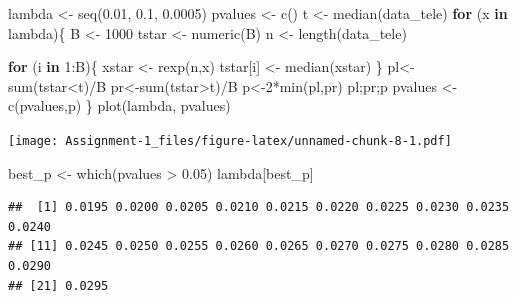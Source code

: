\documentclass[
]{article}
\newenvironment{Shaded}{\begin{snugshade}}{\end{snugshade}}
\newcommand{\ControlFlowTok}[1]{\textcolor[rgb]{0.13,0.29,0.53}{\textbf{#1}}}
\newcommand{\DecValTok}[1]{\textcolor[rgb]{0.00,0.00,0.81}{#1}}
\newcommand{\FloatTok}[1]{\textcolor[rgb]{0.00,0.00,0.81}{#1}}
\newcommand{\FunctionTok}[1]{\textcolor[rgb]{0.00,0.00,0.00}{#1}}
\newcommand{\NormalTok}[1]{#1}
\newcommand{\OtherTok}[1]{\textcolor[rgb]{0.56,0.35,0.01}{#1}}
\newcommand{\SpecialCharTok}[1]{\textcolor[rgb]{0.00,0.00,0.00}{#1}}
\begin{document}
\begin{Shaded}
\begin{Highlighting}[]
\NormalTok{lambda }\OtherTok{\textless{}{-}} \FunctionTok{seq}\NormalTok{(}\FloatTok{0.01}\NormalTok{, }\FloatTok{0.1}\NormalTok{, }\FloatTok{0.0005}\NormalTok{)}
\NormalTok{pvalues }\OtherTok{\textless{}{-}} \FunctionTok{c}\NormalTok{()}
\NormalTok{t }\OtherTok{\textless{}{-}} \FunctionTok{median}\NormalTok{(data\_tele)}
\ControlFlowTok{for}\NormalTok{ (x }\ControlFlowTok{in}\NormalTok{ lambda)\{}
\NormalTok{  B }\OtherTok{\textless{}{-}} \DecValTok{1000}
\NormalTok{  tstar }\OtherTok{\textless{}{-}} \FunctionTok{numeric}\NormalTok{(B)}
\NormalTok{  n }\OtherTok{\textless{}{-}} \FunctionTok{length}\NormalTok{(data\_tele)}
  
  \ControlFlowTok{for}\NormalTok{ (i }\ControlFlowTok{in} \DecValTok{1}\SpecialCharTok{:}\NormalTok{B)\{}
\NormalTok{    xstar }\OtherTok{\textless{}{-}} \FunctionTok{rexp}\NormalTok{(n,x)}
\NormalTok{    tstar[i] }\OtherTok{\textless{}{-}} \FunctionTok{median}\NormalTok{(xstar)}
\NormalTok{  \}}
\NormalTok{  pl}\OtherTok{\textless{}{-}}\FunctionTok{sum}\NormalTok{(tstar}\SpecialCharTok{\textless{}}\NormalTok{t)}\SpecialCharTok{/}\NormalTok{B}
\NormalTok{  pr}\OtherTok{\textless{}{-}}\FunctionTok{sum}\NormalTok{(tstar}\SpecialCharTok{\textgreater{}}\NormalTok{t)}\SpecialCharTok{/}\NormalTok{B}
\NormalTok{  p}\OtherTok{\textless{}{-}}\DecValTok{2}\SpecialCharTok{*}\FunctionTok{min}\NormalTok{(pl,pr)}
\NormalTok{  pl;pr;p}
\NormalTok{  pvalues }\OtherTok{\textless{}{-}} \FunctionTok{c}\NormalTok{(pvalues,p)}
\NormalTok{\}}
\FunctionTok{plot}\NormalTok{(lambda, pvalues)}
\end{Highlighting}
\end{Shaded}

\texttt{[image: Assignment-1\_files/figure-latex/unnamed-chunk-8-1.pdf]}

\begin{Shaded}
\begin{Highlighting}[]
\NormalTok{best\_p }\OtherTok{\textless{}{-}} \FunctionTok{which}\NormalTok{(pvalues }\SpecialCharTok{\textgreater{}} \FloatTok{0.05}\NormalTok{)}
\NormalTok{lambda[best\_p]}
\end{Highlighting}
\end{Shaded}

\begin{verbatim}
##  [1] 0.0195 0.0200 0.0205 0.0210 0.0215 0.0220 0.0225 0.0230 0.0235 0.0240
## [11] 0.0245 0.0250 0.0255 0.0260 0.0265 0.0270 0.0275 0.0280 0.0285 0.0290
## [21] 0.0295
\end{verbatim}
\end{document}
